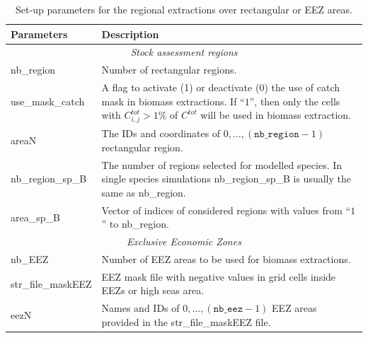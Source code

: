 \begin{table}[H]
\caption{Set-up parameters for the regional extractions over rectangular or EEZ areas.}
\begin{tabular}{p{4cm}p{11.75cm}}
    \hline
    {\bfseries Parameters} & {\bfseries Description}\\ \hline\hline
    \multicolumn{2}{c}{\textit{Stock assessment regions}}\\
    \hline
    {\ttfamily nb\_region} & Number of rectangular regions. \\\hline
    {\ttfamily use\_mask\_catch} & A flag to activate (1) or deactivate (0) the use of catch mask in biomass extractions. If ``$1$'', then only the cells with $C^{tot}_{i,j}>1\%$ of $C^{tot}$ will be used in biomass extraction. \\\hline
    {\ttfamily areaN} & The IDs and coordinates of $0,\dots,\left(\texttt{nb\_region}-1\right)$ rectangular region.\\
	{\ttfamily nb\_region\_sp\_B} & The number of regions selected for modelled species. In single species simulations {\ttfamily nb\_region\_sp\_B} is usually the same as {\ttfamily nb\_region}. \\ 
	\hline
	{\ttfamily area\_sp\_B} & Vector of indices of considered regions with values from ``$1$'' to {\ttfamily nb\_region}.  \\ 
	\hline
	\multicolumn{2}{c}{\textit{Exclusive Economic Zones}}\\
	\hline
	{\ttfamily nb\_EEZ} & Number of EEZ areas to be used for biomass extractions. \\ 
	\hline	
	{\ttfamily str\_file\_maskEEZ} & EEZ mask file with negative values in grid cells inside EEZs or high seas area. \\ 
	\hline
	{\ttfamily eezN} & Names and IDs of $0,\dots,\left(\texttt{nb\_eez}-1\right)$ EEZ areas provided in the {\ttfamily str\_file\_maskEEZ} file.\\\hline
\end{tabular}
\label{tab:configuration_aggregation_zones_1}
\end{table}


